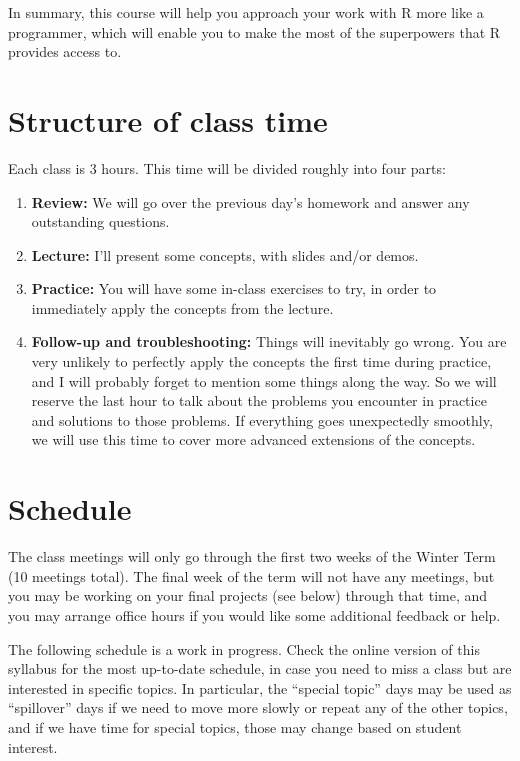 \documentclass{tufte-handout}
\begin{document}
In summary, this course will help you approach your work with R more like a programmer, which will enable you to make the most of the superpowers that R provides access to.
\section*{Structure of class time}
\label{sec-4}

Each class is 3 hours.  This time will be divided roughly into four parts:
\begin{enumerate}
\item \textbf{Review:} We will go over the previous day's homework and answer any outstanding questions.
\item \textbf{Lecture:} I'll present some concepts, with slides and/or demos.
\item \textbf{Practice:} You will have some in-class exercises to try, in order to immediately apply the concepts from the lecture.
\item \textbf{Follow-up and troubleshooting:} Things will inevitably go wrong. You are very unlikely to perfectly apply the concepts the first time during practice, and I will probably forget to mention some things along the way. So we will reserve the last hour to talk about the problems you encounter in practice and solutions to those problems.  If everything goes unexpectedly smoothly, we will use this time to cover more advanced extensions of the concepts.
\end{enumerate}
\section*{Schedule}
\label{sec-5}

The class meetings will only go through the first two weeks of the Winter Term (10 meetings total). The final week of the term will not have any meetings, but you may be working on your final projects (see below) through that time, and you may arrange office hours if you would like some additional feedback or help.

The following schedule is a work in progress.  Check the online version of this syllabus for the most up-to-date schedule, in case you need to miss a class but are interested in specific topics. In particular, the ``special topic'' days may be used as ``spillover'' days if we need to move more slowly or repeat any of the other topics, and if we have time for special topics, those may change based on student interest.
\end{document}
